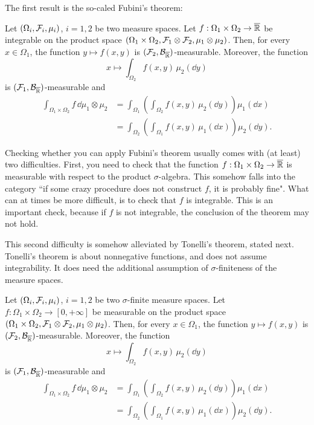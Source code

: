 The first result is the so-caled Fubini's theorem:

\begin{theorem}
Let $(\Omega_i, \mathcal F_i, \mu_i)$, $i=1,2$ be two measure spaces. 
Let $f : \Omega_1 \times \Omega_2 \to \overline{\mathbb R}$ be integrable on the product space $(\Omega_1 \times \Omega_2, \mathcal F_1 \otimes \mathcal F_2, \mu_1 \otimes \mu_2)$. Then, for every $x \in \Omega_1$, the function $y \mapsto f(x, y)$ is $(\mathcal F_2,\mathcal B_{\overline{\mathbb R}})$-measurable. Moreover, the function 
\[
x \mapsto \int_{\Omega_2} f(x,y)\,  \mu_2(\dd y)
\]
is $(\mathcal F_1,\mathcal B_{\overline{\mathbb R}})$-measurable and
\[
\begin{split}
\int_{\Omega_1 \times \Omega_2} f\, \dd \mu_1 \otimes \mu_2 
&= \int_{\Omega_1} \left( \int_{\Omega_2 } f(x,  y ) \,\mu_2(\dd y) \right) \mu_1(\dd x)\\
&= \int_{\Omega_2} \left( \int_{\Omega_1} f(x, y) \, \mu_1(\dd x) \right) \mu_2(\dd y).
\end{split}
\] 
\end{theorem}

Checking whether you can apply Fubini's theorem usually comes with (at least) two difficulties. First, you need to check that the function $f: \Omega_1 \times \Omega_2 \to \overline{\mathbb R}$ is measurable with respect to the product $\sigma$-algebra. This somehow falls into the category ``if some crazy procedure does not construct $f$, it is probably fine". What can at times be more difficult, is to check that $f$ is integrable. This is an important check, because if $f$ is not integrable, the conclusion of the theorem may not hold.

This second difficulty is somehow alleviated by Tonelli's theorem, stated next. Tonelli's theorem is about nonnegative functions, and does not assume integrability. It does need the additional assumption of $\sigma$-finiteness of the measure spaces.

\begin{theorem}
	Let $(\Omega_i, \mathcal F_i, \mu_i)$, $i=1,2$ be two $\sigma$-finite measure spaces. 
	Let $f : \Omega_1 \times \Omega_2 \to [0,+\infty]$ be measurable on the product space $(\Omega_1 \times \Omega_2, \mathcal F_1 \otimes \mathcal F_2, \mu_1 \otimes \mu_2)$. Then, for every $x \in \Omega_1$, the function $y \mapsto f(x, y)$ is $(\mathcal F_2,\mathcal B_{\overline{\mathbb R}})$-measurable. Moreover, the function 
	\[
	x \mapsto \int_{\Omega_2} f(x,y)\, \mu_2(\dd y)
	\]
	is $(\mathcal F_1,\mathcal B_{\overline{\mathbb R}})$-measurable and
	\begin{align*}
	\int_{\Omega_1 \times \Omega_2} f\, \dd \mu_1 \otimes \mu_2 
	&= \int_{\Omega_1} \left( \int_{\Omega_2 } f(x,  y ) \,\mu_2(\dd y) \right) \mu_1(\dd x)\\
	&= \int_{\Omega_2} \left( \int_{\Omega_1} f(x, y)  \,\mu_1(\dd x) \right) \mu_2(\dd y).
	\end{align*}
\end{theorem}

